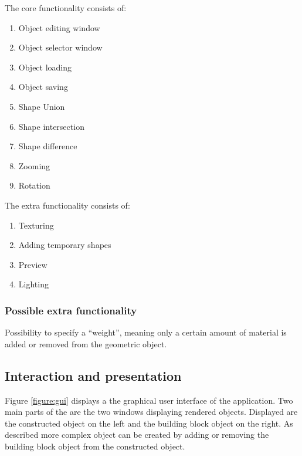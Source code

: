 \documentclass[a4paper,10pt,twocolumn]{article}
\begin{document}
The core functionality consists of: \\
\vspace{-10pt}
\begin{enumerate}
    \setlength{\itemsep}{-0.3em}
	\item Object editing window
	\item Object selector window
	\item Object loading
	\item Object saving
	\item Shape Union
	\item Shape intersection
	\item Shape difference
	\item Zooming
	\item Rotation
\end{enumerate}
\bigskip
The extra functionality consists of: \\
\vspace{-10pt}
\begin{enumerate}
    \setlength{\itemsep}{-0.3em}
	\item Texturing
	\item Adding temporary shapes
	\item Preview
	\item Lighting
\end{enumerate}

\subsubsection{Possible extra functionality}
Possibility to specify a ``weight'', meaning only a certain amount of material is added or removed from the geometric object.

\subsection{Interaction and presentation}



Figure \ref{figure:gui} displays a the graphical user interface of the application. Two main parts of the are the two windows displaying rendered objects. Displayed are the constructed object on the left and the building block object on the right. As described more complex object can be created by adding or removing the building block object from the constructed object.
\end{document}
